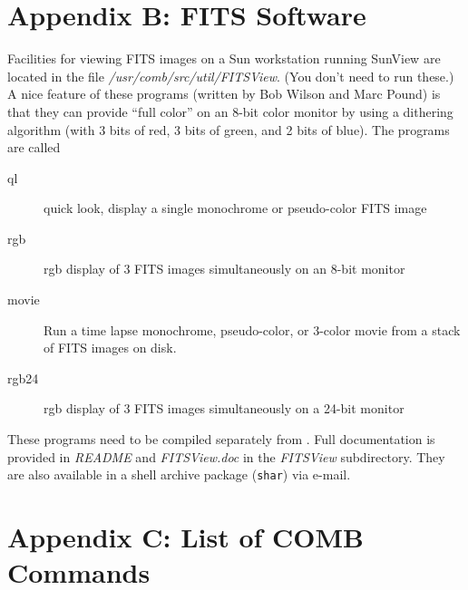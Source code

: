 \section*{Appendix B: FITS Software} 

Facilities for viewing FITS images on a Sun workstation running SunView are 
located in the file {\sl /usr/comb/src/util/FITSView}.
(You don't need \COMB to run these.)
A nice feature of these programs (written by Bob Wilson and Marc Pound) is 
that they can provide ``full color'' on an
8-bit color monitor by using a dithering algorithm (with 3 bits of red,
3 bits of green, and 2 bits of blue).
The programs are called 
\begin{description}
\item [ql]    quick look, display a single monochrome or pseudo-color FITS image
\item [rgb]   rgb display of 3 FITS images simultaneously on an 8-bit monitor
\item [movie] Run a time lapse monochrome, pseudo-color, or 3-color movie
	      from a stack of FITS images on disk.
\item [rgb24] rgb display of 3 FITS images simultaneously on a 24-bit monitor
\end{description}
\noindent
These programs need to be compiled separately from \COMB.
Full documentation is provided in 
{\sl README\/} and {\sl FITSView.doc\/} in the {\sl FITSView\/} subdirectory. 
They are also available in a shell archive package ({\tt shar}) via e-mail. 
\newpage
\section*{Appendix C: List of COMB Commands}
\label{app-lc}

